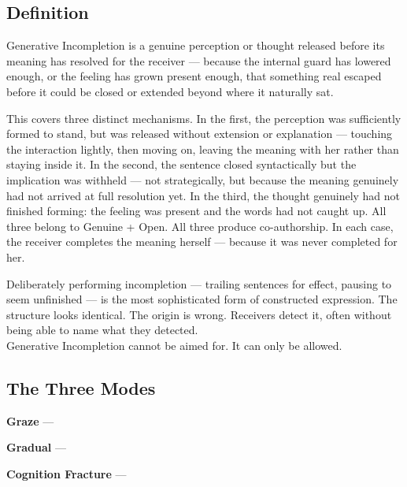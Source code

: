 
\subsection{Definition}

Generative Incompletion is a genuine perception or thought released 
before its meaning has resolved for the receiver --- because the 
internal guard has lowered enough, or the feeling has grown present 
enough, that something real escaped before it could be closed or 
extended beyond where it naturally sat.

This covers three distinct mechanisms. In the first, the perception 
was sufficiently formed to stand, but was released without extension 
or explanation --- touching the interaction lightly, then moving on, 
leaving the meaning with her rather than staying inside it. In the 
second, the sentence closed syntactically but the implication was 
withheld --- not strategically, but because the meaning genuinely 
had not arrived at full resolution yet. In the third, the thought 
genuinely had not finished forming: the feeling was present and the 
words had not caught up. All three belong to Genuine + Open. All 
three produce co-authorship. In each case, the receiver completes 
the meaning herself --- because it was never completed for her.

\begin{calloutbox}
Deliberately performing incompletion --- trailing sentences for effect, 
pausing to seem unfinished --- is the most sophisticated form of 
constructed expression. The structure looks identical. The origin is wrong. 
Receivers detect it, often without being able to name what they detected.\\[0.4em]
Generative Incompletion cannot be aimed for. It can only be allowed.
\end{calloutbox}

\subsection{The Three Modes}\label{subsec:three_modes}

\textbf{Graze}\label{graze} --- 

\vspace{0.5em}
\textbf{Gradual}\label{gradual_revelation} --- 

\vspace{0.5em}
\textbf{Cognition Fracture}\label{cognition_fracture} --- 

